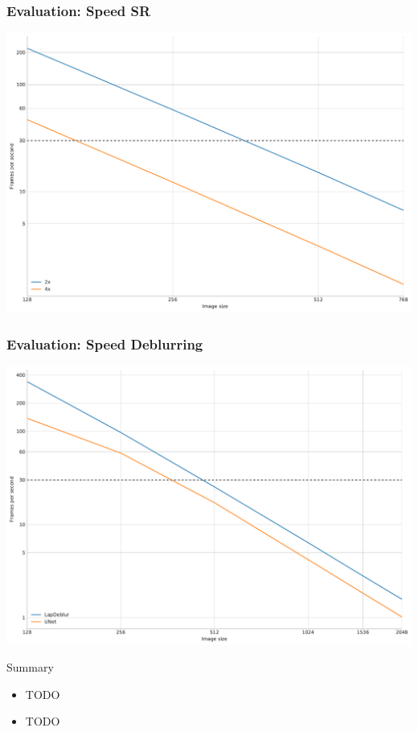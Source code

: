 \documentclass{beamer}
\begin{document}
\begin{frame} \frametitle{Evaluation: Speed SR}
 \includegraphics[width=1.0\textwidth]{time_upscaling}
\end{frame}

\begin{frame} \frametitle{Evaluation: Speed Deblurring}
 \includegraphics[width=1.0\textwidth]{time_denoising}
\end{frame}


\begin{frame}{Summary}
\begin{itemize}
  \item TODO
  \item TODO
\end{itemize}

\end{frame}
\end{document}
